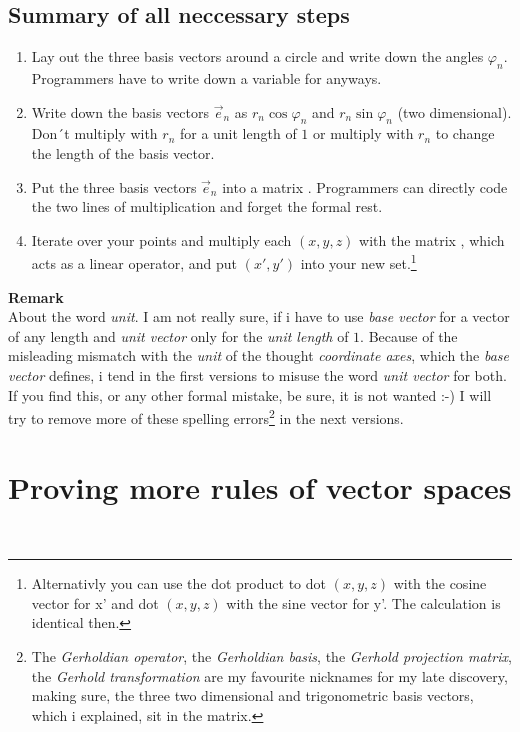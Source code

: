 \documentclass[a4paper]{article}
\begin{document}
\subsection{Summary of all neccessary steps}
\begin{enumerate}
\item Lay out the three basis vectors around a circle and write down the angles $\varphi_n$. Programmers have to write down a variable for anyways.
\item Write down the basis vectors $\vec{e}_n$ as $r_n \cos \varphi_n$ and $r_n \sin \varphi_n$ (two dimensional). Don´t multiply with $r_n$ for a unit length of $1$ or multiply with $r_n$ to change the length of the basis vector.
\item Put the three basis vectors $\vec{e}_n$ into a matrix . Programmers can directly code the two lines of multiplication and forget the formal rest.
\item Iterate over your points and multiply each $(x,y,z)$ with the matrix , which acts as a linear operator, and put $(x',y')$ into your new set.\footnote{Alternativly you can use the dot product to dot $(x,y,z)$ with the cosine vector for x' and dot $(x,y,z)$ with the sine vector for y'. The calculation is identical then.}
\end{enumerate}

\textbf{Remark}\\
About the word \emph{unit}. I am not really sure, if i have to use \emph{base vector} for a vector of any length and \emph{unit vector} only for the \emph{unit length} of $1$. Because of the misleading mismatch with the \emph{unit} of the thought \emph{coordinate axes}, which the \emph{base vector} defines, i tend in the first versions to misuse the word \emph{unit vector} for both. If you find this, or any other formal mistake, be sure, it is not wanted :-) I will try to remove more of these spelling errors\footnote{The \emph{Gerholdian operator}, the \emph{Gerholdian basis}, the \emph{Gerhold projection matrix}, the \emph{Gerhold transformation} are my favourite nicknames for my late discovery, making sure, the three two dimensional and trigonometric basis vectors, which i explained, sit in the matrix.} in the next versions.

\appendix

\section{Proving more rules of vector spaces}\\
\end{document}
